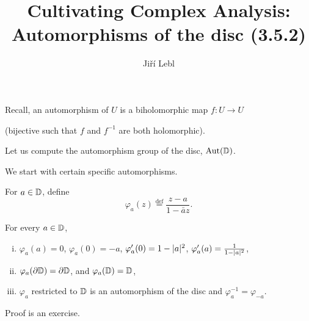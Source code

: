 \documentclass[10pt,aspectratio=169]{beamer}
\author{Ji\v{r}\'i Lebl}
\institute[OSU]{%
Departemento pri Matematiko de Oklahoma {\^S}tata Universitato}
\title{Cultivating Complex Analysis:\\%
Automorphisms of the disc (3.5.2)}
\date{}
\begin{document}
\begin{frame}
\titlepage
\end{frame}

\begin{frame}
Recall, an automorphism of $U$ is a biholomorphic map $f \colon U \to U$

(bijective such that $f$ and $f^{-1}$ are both holomorphic).

\medskip
\pause

Let us compute the automorphism group of the disc, $\operatorname{Aut}({\mathbb{D}})$.

\medskip
\pause

We start with certain specific automorphisms.

\medskip
\pause

For $a \in {\mathbb{D}}$, define
\[
\varphi_a(z) \overset{\text{def}}{=} \frac{z-a}{1-\bar{a}z}.
\]

\pause

\begin{proposition}
For every $a \in {\mathbb{D}}$,
\begin{enumerate}[(i)]
\item
$\varphi_a(a) = 0$, \enspace
$\varphi_a(0) = -a$, \enspace
$\varphi_a'(0) = 1 - \lvert {a} \rvert^2$, \enspace
$\varphi_a'(a) = \frac{1}{1 - \lvert {a} \rvert^2}$,
\pause
\item
$\varphi_a(\partial {\mathbb{D}}) = \partial {\mathbb{D}}$,
and
$\varphi_a({\mathbb{D}}) = {\mathbb{D}}$,
\pause
\item
$\varphi_a$ restricted to ${\mathbb{D}}$ is an automorphism of the disc and
$\varphi_a^{-1} = \varphi_{-a}$.
\end{enumerate}
\end{proposition}
\pause

Proof is an exercise.
\end{frame}
\end{document}
